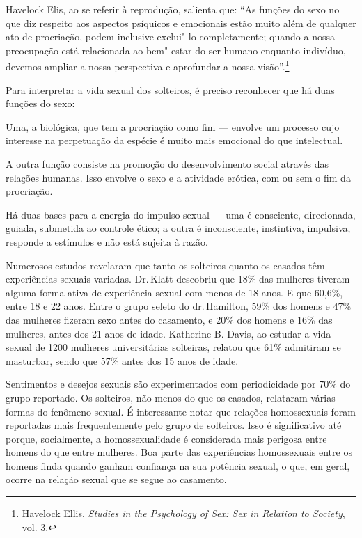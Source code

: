 Havelock Elis, ao se referir à reprodução, salienta que: ``As funções do
sexo no que diz respeito aos aspectos psíquicos e emocionais estão muito
além de qualquer ato de procriação, podem inclusive exclui"-lo
completamente; quando a nossa preocupação está relacionada ao
bem"-estar do ser humano enquanto indivíduo, devemos ampliar a nossa
perspectiva e aprofundar a nossa visão''.\footnote{Havelock Ellis,
  \emph{Studies in the Psychology of Sex: Sex in Relation to Society},
  vol. 3.}

Para interpretar a vida sexual dos solteiros, é preciso reconhecer que
há duas funções do sexo:

Uma, a biológica, que tem a procriação como fim --- envolve um processo cujo
interesse na perpetuação da espécie é muito mais emocional do que
intelectual.

A outra função consiste na promoção do desenvolvimento social através
das relações humanas. Isso envolve o sexo e a atividade erótica, com ou
sem o fim da procriação.

Há duas bases para a energia do impulso sexual --- uma é consciente,
direcionada, guiada, submetida ao controle ético; a outra é
inconsciente, instintiva, impulsiva, responde a estímulos e não está
sujeita à razão.

\asterisc

Numerosos estudos revelaram que tanto os solteiros quanto os casados
têm experiências sexuais variadas. Dr.\,Klatt descobriu que 18\% das
mulheres tiveram alguma forma ativa de experiência sexual com menos de
18 anos. E que 60,6\%, entre 18 e 22 anos. Entre o grupo seleto do dr.\,Hamilton, 59\% dos homens e 47\% das mulheres fizeram sexo antes do
casamento, e 20\% dos homens e 16\% das mulheres, antes dos 21 anos de
idade. Katherine B. Davis, ao estudar a vida sexual de 1200 mulheres
universitárias solteiras, relatou que 61\% admitiram se masturbar, sendo
que 57\% antes dos 15 anos de idade.

Sentimentos e desejos sexuais são experimentados com periodicidade por
70\% do grupo reportado. Os solteiros, não menos do que os
casados, relataram várias formas do fenômeno sexual. É interessante
notar que relações homossexuais foram reportadas mais frequentemente
pelo grupo de solteiros. Isso é significativo até porque, socialmente, a
homossexualidade é considerada mais perigosa entre homens do que entre
mulheres. Boa parte das experiências homossexuais entre os homens finda
quando ganham confiança na sua potência sexual, o que, em geral, ocorre na relação sexual que se segue ao casamento.

